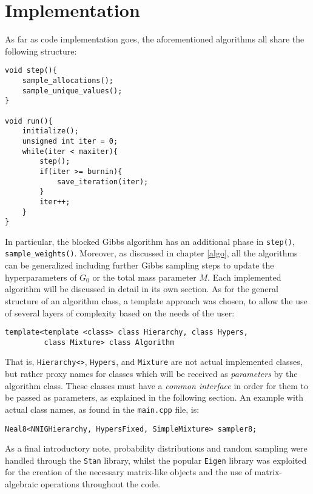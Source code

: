 \chapter{Implementation}


As far as code implementation goes, the aforementioned algorithms all share the following structure:
\begin{verbatim}
void step(){
    sample_allocations();
    sample_unique_values();
}

void run(){
    initialize();
    unsigned int iter = 0;
    while(iter < maxiter){
        step();
        if(iter >= burnin){
            save_iteration(iter);
        }
        iter++;
    }
}
\end{verbatim}
In particular, the blocked Gibbs algorithm has an additional phase in \verb|step()|, \verb|sample_weights()|. Moreover, as discussed in chapter \ref{algo}, all the algorithms can be generalized including further Gibbs sampling steps to update the hyperparameters of $G_0$ or the total mass parameter $M$.
Each implemented algorithm will be discussed in detail in its own section.
As for the general structure of an algorithm class, a template approach was chosen, to allow the use of several layers of complexity based on the needs of the user:
\begin{verbatim}
template<template <class> class Hierarchy, class Hypers,
         class Mixture> class Algorithm
\end{verbatim}
That is, \verb|Hierarchy<>|, \verb|Hypers|, and \verb|Mixture| are not actual implemented classes, but rather proxy names for classes which will be received as \emph{parameters} by the algorithm class.
These classes must have a \emph{common interface} in order for them to be passed as parameters, as explained in the following section.
An example with actual class names, as found in the \verb|main.cpp| file, is:
\begin{verbatim}
Neal8<NNIGHierarchy, HypersFixed, SimpleMixture> sampler8;
\end{verbatim}
As a final introductory note, probability distributions and random sampling were handled through the \verb|Stan| library, whilst the popular \verb|Eigen| library was exploited for the creation of the necessary matrix-like objects and the use of matrix-algebraic operations throughout the code.
